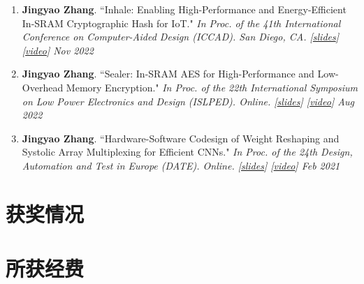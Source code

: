 \documentclass{resume}
\begin{document}
\begin{enumerate}[label=\arabic*., itemsep=1pt, topsep=3pt]
    \item \textbf{Jingyao Zhang}. ``Inhale: Enabling High-Performance and Energy-Efficient In-SRAM Cryptographic Hash for IoT." \textit{In Proc. of the 41th International Conference on Computer-Aided Design (ICCAD). San Diego, CA. 
    \emph{[\href{https://jingyao-zhang.github.io/slides/ICCAD-2022-Slides.pdf}{slides}]
    [\href{https://www.youtube.com/watch?v=e3KeH8AqGks}{video}]}
    \hfill Nov 2022} \vspace{-2pt}

    \item \textbf{Jingyao Zhang}. ``Sealer: In-SRAM AES for High-Performance and Low-Overhead Memory Encryption." \textit{In Proc. of the 22th International Symposium on Low Power Electronics and Design (ISLPED). Online.
    \emph{[\href{https://jingyao-zhang.github.io/slides/ISLPED-2022-Slides.pdf}{slides}]
    [\href{https://www.youtube.com/watch?v=mBx0Q7_Zk8c}{video}]}
    \hfill Aug 2022} \vspace{-2pt}

    \item \textbf{Jingyao Zhang}. ``Hardware-Software Codesign of Weight Reshaping and Systolic Array Multiplexing for Efficient CNNs." \textit{In Proc. of the 24th Design, Automation and Test in Europe (DATE). Online.
    \emph{[\href{https://jingyao-zhang.github.io/slides/DATE-2021-Slides.pdf}{slides}]
    [\href{https://www.youtube.com/watch?v=HiyUaztZrys}{video}]}
    \hfill Feb 2021} \vspace{-2pt}
\end{enumerate}

\section{获奖情况}

\section{所获经费}
\end{document}
